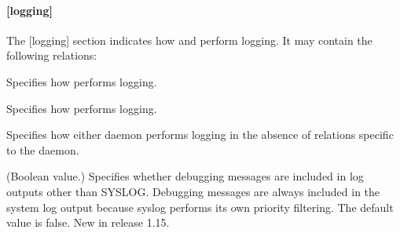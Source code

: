 \documentclass[letterpaper,10pt,english]{sphinxmanual}
\begin{document}
\paragraph{{[}logging{]}}
\label{\detokenize{admin/conf_files/kdc_conf:logging}}\label{\detokenize{admin/conf_files/kdc_conf:id4}}
\sphinxAtStartPar
The {[}logging{]} section indicates how {\hyperref[\detokenize{admin/admin_commands/krb5kdc:krb5kdc-8}]{}} and
{\hyperref[\detokenize{admin/admin_commands/kadmind:kadmind-8}]{}} perform logging.  It may contain the following
relations:
\begin{description}
\sphinxAtStartPar
Specifies how {\hyperref[\detokenize{admin/admin_commands/kadmind:kadmind-8}]{}} performs logging.

\sphinxAtStartPar
Specifies how {\hyperref[\detokenize{admin/admin_commands/krb5kdc:krb5kdc-8}]{}} performs logging.

\sphinxAtStartPar
Specifies how either daemon performs logging in the absence of
relations specific to the daemon.

\sphinxAtStartPar
(Boolean value.)  Specifies whether debugging messages are
included in log outputs other than SYSLOG.  Debugging messages are
always included in the system log output because syslog performs
its own priority filtering.  The default value is false.  New in
release 1.15.

\end{description}
\end{document}
